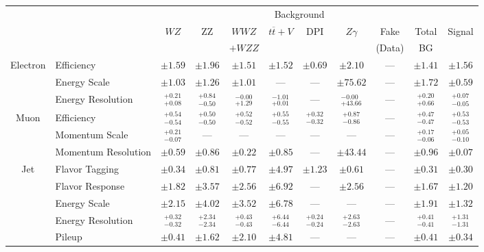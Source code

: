 \small\renewcommand{\tabcolsep}{1pt}
\begin{tabular}{|cl||ccccccc|c||c|}
\hline
 & & \multicolumn{8}{c||}{Background} & \\ 
 & & $WZ$ & ZZ & $WWZ$ & $t\overline{t}+V$ & DPI & $Z\gamma$ & Fake & Total & Signal\\ 
 & & &  & $+WZZ$ &  &  &  & (Data) & BG & \\ 
\hline\hline
\multirow{3}{*}{Electron}
& Efficiency  & $\pm 1.59$  & $\pm 1.96$  & $\pm 1.51$  & $\pm 1.52$  & $\pm 0.69$  & $\pm 2.10$  & ---  & $\pm 1.41$  & $\pm 1.56$ \\ 
\cline{2-11}
& Energy Scale  & $\pm 1.03$  & $\pm 1.26$  & $\pm 1.01$  & ---  & ---  & $\pm 75.62$  & ---  & $\pm 1.72$  & $\pm 0.59$ \\ 
\cline{2-11}
&Energy Resolution &  $^{+0.21}_{+0.08}$  &  $^{+0.84}_{-0.50}$  &  $^{-0.00}_{+1.29}$  &  $^{-1.01}_{+0.01}$  & --- &  $^{-0.00}_{+43.66}$  & --- &  $^{+0.20}_{+0.66}$  &  $^{+0.07}_{-0.05}$ \\ 
\hline
\multirow{3}{*}{Muon}
&Efficiency &  $^{+0.54}_{-0.54}$  &  $^{+0.50}_{-0.50}$  &  $^{+0.52}_{-0.52}$  &  $^{+0.55}_{-0.55}$  &  $^{+0.32}_{-0.32}$  &  $^{+0.87}_{-0.86}$  & --- &  $^{+0.47}_{-0.47}$  &  $^{+0.53}_{-0.53}$ \\ 
\cline{2-11}
&Momentum Scale &  $^{+0.21}_{-0.07}$  & --- & --- & --- & --- & --- & --- &  $^{+0.17}_{-0.06}$  &  $^{+0.05}_{-0.10}$ \\ 
\cline{2-11}
& Momentum Resolution  & $\pm 0.59$  & $\pm 0.86$  & $\pm 0.22$  & $\pm 0.85$  & ---  & $\pm 43.44$  & ---  & $\pm 0.96$  & $\pm 0.07$ \\ 
\hline
\multirow{6}{*}{Jet}
& Flavor Tagging  & $\pm 0.34$  & $\pm 0.81$  & $\pm 0.77$  & $\pm 4.97$  & $\pm 1.23$  & $\pm 0.61$  & ---  & $\pm 0.31$  & $\pm 0.30$ \\ 
\cline{2-11}
& Flavor Response  & $\pm 1.82$  & $\pm 3.57$  & $\pm 2.56$  & $\pm 6.92$  & ---  & $\pm 2.56$  & ---  & $\pm 1.67$  & $\pm 1.20$ \\ 
\cline{2-11}
& Energy Scale  & $\pm 2.15$  & $\pm 4.02$  & $\pm 3.52$  & $\pm 6.78$  & ---  & ---  & ---  & $\pm 1.91$  & $\pm 1.32$ \\ 
\cline{2-11}
&Energy Resolution &  $^{+0.32}_{-0.32}$  &  $^{+2.34}_{-2.34}$  &  $^{+0.43}_{-0.43}$  &  $^{+6.44}_{-6.44}$  &  $^{+0.24}_{-0.24}$  &  $^{+2.63}_{-2.63}$  & --- &  $^{+0.41}_{-0.41}$  &  $^{+1.31}_{-1.31}$ \\ 
\cline{2-11}
& Pileup  & $\pm 0.41$  & $\pm 1.62$  & $\pm 2.10$  & $\pm 4.81$  & ---  & ---  & ---  & $\pm 0.41$  & $\pm 0.34$ \\ 

\end{tabular}
